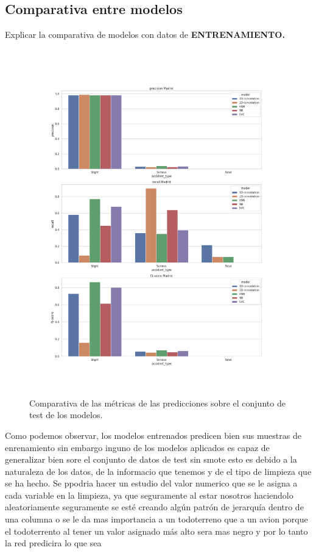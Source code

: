   \subsection{Comparativa entre modelos}

    Explicar la comparativa de modelos con datos de \textbf{ENTRENAMIENTO.}


    \begin{figure}[h]
        \centering
        \includegraphics[width=16cm]{archivos/5.Resultados/ComparativaTest}
        \caption{Comparativa de las métricas de las predicciones sobre el conjunto de test de los modelos.}
        \label{ResultsTestImage}
     \end{figure}



Como podemos observar, los modelos entrenados predicen bien sus muestras de enrenamiento sin embargo inguno de los modelos aplicados es capaz de generalizar bien sore el conjunto de datos de test sin smote
esto es debido a la naturaleza de los datos, de la informacio que tenemos y de el tipo de limpieza que se ha hecho. Se ppodria hacer un estudio del valor numerico que se le asigna a cada variable en la limpieza, ya que seguramente al estar nosotros haciendolo aleatoriamente seguramente se esté creando algún patrón de jerarquía dentro de una columna o se le da mas importancia a un todoterreno que a un avion porque el todoterrento al tener un valor asignado más alto sera mas negro y por lo tanto la red predicira lo que sea